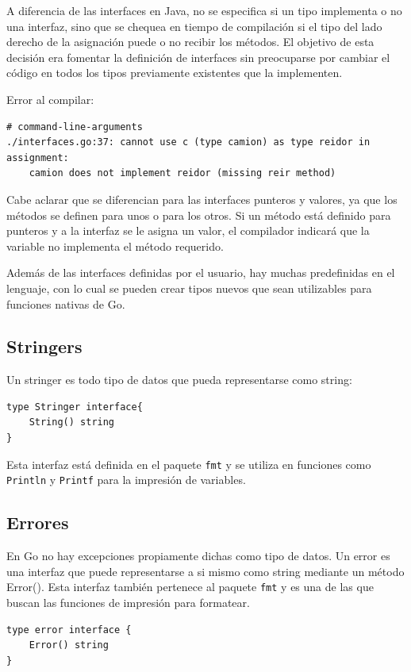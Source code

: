 \documentclass{article}
\begin{document}
A diferencia de las interfaces en Java, no se especifica si un tipo implementa o no una interfaz, sino que se chequea en tiempo de compilación si el tipo del lado derecho de la asignación puede o no recibir los métodos. El objetivo de esta decisión era fomentar la definición de interfaces sin preocuparse por cambiar el código en todos los tipos previamente existentes que la implementen\cite{implements}.


Error al compilar:
\begin{verbatim}
# command-line-arguments
./interfaces.go:37: cannot use c (type camion) as type reidor in assignment:
	camion does not implement reidor (missing reir method)
\end{verbatim}

Cabe aclarar que se diferencian para las interfaces punteros y valores, ya que los métodos se definen para unos o para los otros. Si un método está definido para punteros y a la interfaz se le asigna un valor, el compilador indicará que la variable no implementa el método requerido.

Además de las interfaces definidas por el usuario, hay muchas predefinidas en el lenguaje, con lo cual se pueden crear tipos nuevos que sean utilizables para funciones nativas de Go.

\subsection{Stringers}
Un stringer es todo tipo de datos que pueda representarse como string:
\begin{lstlisting}[caption = firma de stringers]
type Stringer interface{
	String() string
}
\end{lstlisting}
Esta interfaz está definida en el paquete \verb|fmt| y se utiliza en funciones como \verb|Println| y \verb|Printf| para la impresión de variables.

\subsection{Errores}
En Go no hay excepciones propiamente dichas como tipo de datos. Un error es una interfaz que puede representarse a si mismo como string mediante un método Error(). Esta interfaz también pertenece al paquete \verb|fmt| y es una de las que buscan las funciones de impresión para formatear.

\begin{lstlisting}[caption = firma de errores]
type error interface {
    Error() string
}
\end{lstlisting}
\end{document}
